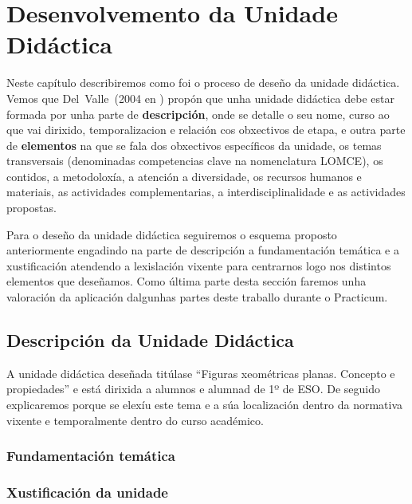 \chapter{Desenvolvemento da Unidade Didáctica}\label{chap:desenvolvemento}
Neste capítulo describiremos como foi o proceso de deseño da unidade didáctica. Vemos que Del~Valle~(2004 en ) propón que unha unidade didáctica debe estar formada por unha parte de \textbf{descripción}, onde se detalle o seu nome, curso ao que vai dirixido, temporalizacion e relación cos obxectivos de etapa, e outra parte de \textbf{elementos} na que se fala dos obxectivos específicos da unidade, os temas transversais (denominadas competencias clave na nomenclatura LOMCE), os contidos, a metodoloxía, a atención a diversidade, os recursos humanos e materiais, as actividades complementarias, a interdisciplinalidade e as actividades propostas.

Para o deseño da unidade didáctica seguiremos o esquema proposto anteriormente engadindo na parte de descripción a fundamentación temática e a xustificación atendendo a lexislación vixente para centrarnos logo nos distintos elementos que deseñamos. Como última parte desta sección faremos unha valoración da aplicación dalgunhas partes deste traballo durante o Practicum.

\section{Descripción da Unidade Didáctica}
A unidade didáctica deseñada titúlase ``Figuras xeométricas planas. Concepto e propiedades'' e está dirixida a alumnos e alumnad de 1º de ESO. De seguido explicaremos porque se elexíu este tema e a súa localización dentro da normativa vixente e temporalmente dentro do curso académico.

\subsection{Fundamentación temática}

\subsection{Xustificación da unidade}

